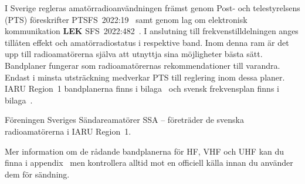 I Sverige regleras amatörradioanvändningen främst genom Post- och
telestyrelsens (PTS) föreskrifter PTSFS~2022:19~\cite{PTSFS2022:19} samt genom lag
om elektronisk kommunikation \textbf{LEK} SFS~2022:482~\cite{SFS2022:482}.
I anslutning till frekvenstilldelningen anges tillåten effekt och
amatörradiostatus i respektive band.
Inom denna ram är det upp till radioamatörerna själva att utnyttja sina
möjligheter bästa sätt.
Bandplaner fungerar som radioamatörernas rekommendationer till varandra.
Endast i minsta utsträckning medverkar PTS till reglering inom dessa planer.
IARU Region~1 bandplanerna finns i bilaga~ och svensk
frekvensplan finns i bilaga~.

Föreningen Sveriges Sändareamatörer SSA -- företräder de svenska
radioamatörerna i IARU Region~1.

Mer information om de rådande bandplanerna för HF, VHF och UHF kan du finna i
appendix~ men kontrollera alltid mot en officiell källa
innan du använder dem för sändning.
